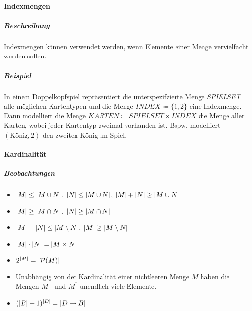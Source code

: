 		\paragraph{Indexmengen}
			\subparagraph{Beschreibung}
				Indexmengen können verwendet werden, wenn Elemente einer Menge vervielfacht werden sollen.

			\subparagraph{Beispiel}
				In einem Doppelkopfspiel repräsentiert die unterspezifzierte Menge \textit{SPIELSET} alle möglichen Kartentypen und die Menge $ \textit{INDEX} \coloneqq \{ 1, 2 \} $ eine Indexmenge. Dann modelliert die Menge $ \textit{KARTEN} \coloneqq \textit{SPIELSET} \times \textit{INDEX} $ die Menge aller Karten, wobei jeder Kartentyp zweimal vorhanden ist. Bspw. modelliert $ (\text{König}, 2) $ den zweiten König im Spiel.


		\paragraph{Kardinalität}

			\subparagraph{Beobachtungen}
				\begin{itemize}
					\item $ \abs{M} \leq \abs{M \cup N} $, $ \abs{N} \leq \abs{M \cup N} $, $ \abs{M} + \abs{N} \geq \abs{M \cup N} $
					\item $ \abs{M} \geq \abs{M \cap N} $, $ \abs{N} \geq \abs{M \cap N} $
					\item $ \abs{M} - \abs{N} \leq \abs{M \setminus N} $, $ \abs{M} \geq \abs{M \setminus N} $
					\item $ \abs{M} \cdot \abs{N} = \abs{M \times N} $
					\item $ 2 ^ { \abs{M} } = \abs{\mathcal{P}(M)} $
					\item Unabhängig von der Kardinalität einer nichtleeren Menge $ M $ haben die Mengen $ M ^ + $ und $ M ^ * $ unendlich viele Elemente.
					\item $ (\abs{B} + 1) ^ \abs{D} = \abs{D \rightharpoonup B} $
				\end{itemize}

